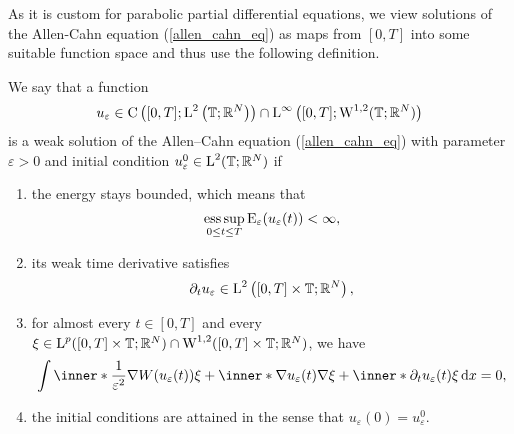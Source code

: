 As it is custom for parabolic partial differential equations, we view solutions 
of the Allen-Cahn equation (\ref{allen_cahn_eq}) as maps from $ [0,T] $ into 
some suitable function space and thus use the following definition.

\begin{definition}
	\label{solution_to_ac}
	We say that a function 
	\begin{equation*}
	u_{ \varepsilon} \in 
	\mathrm{ C } \left( [0 , T ] ; \operatorname{L}^{ 2 } \left( \operatorname{\mathbb{T}}; \mathbb{ R }^{ 
	N } \right) \right) \cap
	\operatorname{L}^{ \infty } \left( [0, T ]; \operatorname{W}^{ 1, 2 } ( \operatorname{\mathbb{T}} ; \mathbb{ R }^{ 
	N } ) \right)
	\end{equation*}
	is a weak solution of the Allen--Cahn equation (\ref{allen_cahn_eq}) with parameter $ \varepsilon > 0 $ and initial condition $ u_{ \varepsilon}^{ 0 } \in \operatorname{L}^{ 2 } ( \operatorname{\mathbb{T}} ; \mathbb{ R }^{ N } ) $ if
	\begin{enumerate}
		\item the energy stays bounded, which means that
		\begin{equation}
			\operatorname*{ess\,sup}_{ 0 \leq t \leq T }
			\operatorname{E}_{ \varepsilon } ( u_{ \varepsilon } ( t ) ) 
			< \infty,
		\end{equation}
		\item 
		its weak time derivative satisfies
		\begin{equation}
			\partial_{ t } u_{ \varepsilon }
			\in
			\operatorname{L}^{ 2 } \left( [ 0 , T ] \times \operatorname{\mathbb{T}} ; \mathbb{ R }^{ N } \right),
		\end{equation}
		\item 
		\label{here_appears_p}
		for almost every $ t \in [ 0 , T ] $ and every 
		$ \xi \in \operatorname{L}^{ p } ( [ 0 , T ] \times \operatorname{\mathbb{T}}; \mathbb{ R }^{ N } ) 
		\cap
		\operatorname{W}^{ 1, 2 } ( [ 0, T ] \times \operatorname{\mathbb{T}} ; \mathbb{ R }^{ N } ) $,
		we have
		\begin{equation}
			\label{ac_weak_equation}
			\int
			\inner*{ \frac{ 1 }{ \varepsilon^{ 2 } } \nabla W ( u_{ \varepsilon} ( t ) ) }{ \xi }
			+
			\inner*{ \nabla u_{ \varepsilon } ( t ) }{ \nabla \xi } 
			+
			\inner*{\partial_{ t } u_{ \varepsilon} ( t ) }{ \xi }
			\dd{x}
			=
			0,
		\end{equation}
		\item 
		the initial conditions are attained in the sense that $ u_{ \varepsilon 
		} ( 0 ) = u_{ \varepsilon}^{ 0 } $.
	\end{enumerate}
\end{definition}

